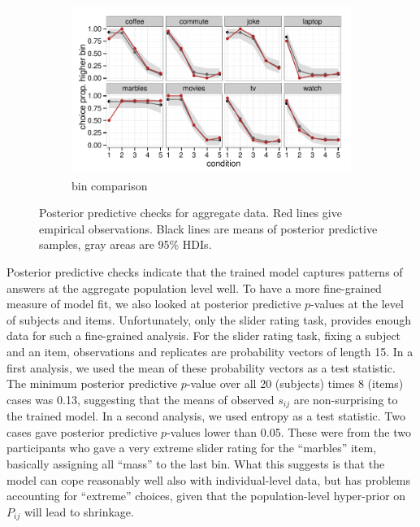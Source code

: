 \documentclass[10pt,letterpaper]{article}
\begin{document}
\begin{figure}
  \begin{subfigure}[b]{0.5\textwidth}
    \includegraphics[width = \textwidth]{plots/ppc_choice.pdf}
    \caption{bin comparison}
    \label{fig:lightingPPC}
  \end{subfigure}

  \caption{Posterior predictive checks for aggregate data. Red lines give empirical
    observations. Black lines are means of posterior predictive samples, gray areas are
    95\% HDIs.}
  \label{fig:PPCs}
\end{figure}

Posterior predictive checks indicate that the trained model captures patterns of answers at the
aggregate population level well. To have a more fine-grained measure of model fit, we also
looked at posterior predictive $p$-values at the level of subjects and items. Unfortunately,
only the slider rating task, provides enough data for such a fine-grained analysis. For the
slider rating task, fixing a subject and an item, observations and replicates are probability
vectors of length 15. In a first analysis, we used the mean of these probability vectors as a
test statistic. The minimum posterior predictive $p$-value over all 20 (subjects) times 8
(items) cases was 0.13, suggesting that the means of observed $s_{ij}$ are non-surprising to
the trained model. In a second analysis, we used entropy as a test statistic. Two cases gave
posterior predictive $p$-values lower than 0.05. These were from the two participants who gave a
very extreme slider rating for the ``marbles'' item, basically assigning all ``mass'' to the
last bin. What this suggests is that the model can cope reasonably well also with
individual-level data, but has problems accounting for ``extreme'' choices, given that the
population-level hyper-prior on $P_{ij}$ will lead to shrinkage.
\end{document}
